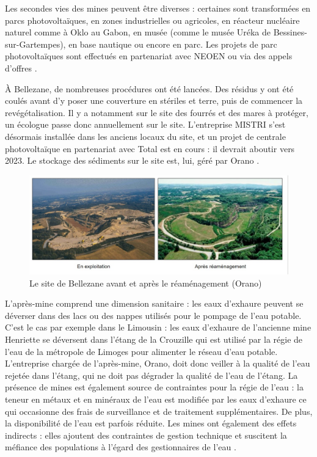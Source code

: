 \documentclass{article}
\begin{document}
Les secondes vies des mines peuvent être diverses : certaines sont transformées en parcs photovoltaïques, en zones industrielles ou agricoles, en réacteur nucléaire naturel comme à Oklo au Gabon, en musée (comme le musée Uréka de Bessines-sur-Gartempes), en base nautique ou encore en parc. Les projets de parc photovoltaïques sont effectués en partenariat avec NEOEN ou via des appels d’offres \cite{himeur_apres-mine_2020}.

À Bellezane, de nombreuses procédures ont été lancées. Des résidus y ont été coulés avant d’y poser une couverture en stériles et terre, puis de commencer la revégétalisation. Il y a notamment sur le site des fourrés et des mares à protéger, un écologue passe donc annuellement sur le site. L’entreprise MISTRI s’est désormais installée dans les anciens locaux du site, et un projet de centrale photovoltaïque en partenariat avec Total est en cours : il devrait aboutir vers 2023. Le stockage des sédiments sur le site est, lui, géré par Orano \cite{benesteau_site_2020}.

\begin{figure}[!hbt]
    \centering
    \includegraphics[width=\linewidth]{I_B_2.jpg}
    \caption{Le site de Bellezane avant et après le réaménagement (Orano)}
    \label{fig:bellezane_avant_apres}
\end{figure}

L’après-mine comprend une dimension sanitaire : les eaux d’exhaure peuvent se déverser dans des lacs ou des nappes utilisés pour le pompage de l’eau potable. C’est le cas par exemple dans le Limousin : les eaux d’exhaure de l’ancienne mine Henriette se déversent dans l’étang de la Crouzille qui est utilisé par la régie de l’eau de la métropole de Limoges pour alimenter le réseau d’eau potable. L’entreprise chargée de l’après-mine, Orano, doit donc veiller à la qualité de l’eau rejetée dans l’étang, qui ne doit pas dégrader la qualité de l’eau de l’étang. La présence de mines est également source de contraintes pour la régie de l’eau : la teneur en métaux et en minéraux de l’eau est modifiée par les eaux d’exhaure ce qui occasionne des frais de surveillance et de traitement supplémentaires. De plus, la disponibilité de l’eau est parfois réduite. Les mines ont également des effets indirects : elles ajoutent des contraintes de gestion technique et suscitent la méfiance des populations à l’égard des gestionnaires de l’eau \cite{vialleseche_station_2020}.
\end{document}
